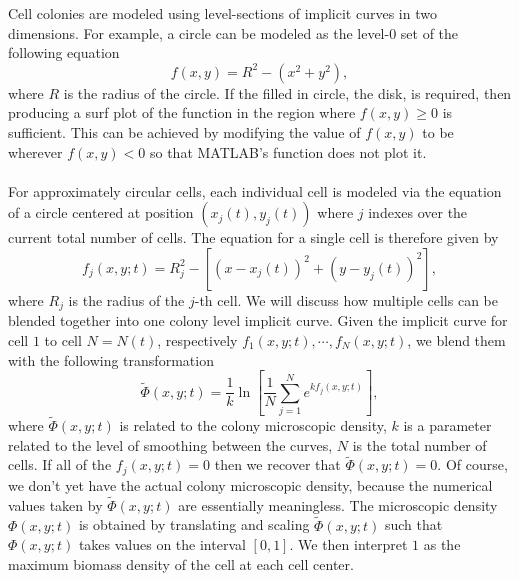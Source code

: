 Cell colonies are modeled using level-sections of implicit curves in two dimensions. For example, a circle can be modeled as the level-0 set of the following equation
\begin{equation*}
    f(x,y) =R^2-( x^2 + y^2),
\end{equation*}
where $R$ is the radius of the circle. If the filled in circle, the disk, is required, then producing a surf plot of the function in the region where $f(x,y) \geq 0$ is sufficient. This can be achieved by modifying the value of $f(x,y)$ to be  wherever $f(x,y)<0$ so that MATLAB's  function does not plot it.
\\
\\
For approximately circular cells, each individual cell is modeled via the equation of a circle centered at position $(x_j(t),y_j(t))$ where $j$ indexes over the current total number of cells. The equation for a single cell is therefore given by
\begin{equation*}
    f_j(x,y;t) =R_j^2- \left[ (x-x_j(t))^2 + (y-y_j(t))^2\right],
\end{equation*}
where $R_j$ is the radius of the $j$-th cell. We will discuss how multiple cells can be blended together into one colony level implicit curve. Given the implicit curve for cell $1$ to cell $N = N(t)$, respectively $f_1(x,y;t), \cdots, f_N(x,y; t)$, we blend them with the following transformation
\begin{equation*}
    \tilde{\Phi}(x,y;t) = \frac{1}{k}\ln{ \left[ \frac{1}{N} \sum_{j=1}^N{ e^{k f_j(x,y;t)}} \right]},
\end{equation*}
where $\tilde{\Phi}(x,y;t) $ is related to the colony microscopic density, $k$ is a 
parameter related to the level of smoothing between the curves, $N$ is the total number of cells. 
If all of the $f_j(x,y;t) =0$ then we recover that $\tilde{\Phi}(x,y;t) =0$. Of course, we don't yet have the actual colony microscopic density, because the numerical values taken by $\tilde{\Phi}(x,y;t) $ are essentially meaningless. The microscopic density $\Phi(x,y;t)$ is obtained by translating and scaling $\tilde{\Phi}(x,y;t) $ such that $\Phi(x,y;t) $ takes values on the interval $[0,1]$. We then interpret $1$ as the maximum biomass density of the cell at each cell center.

